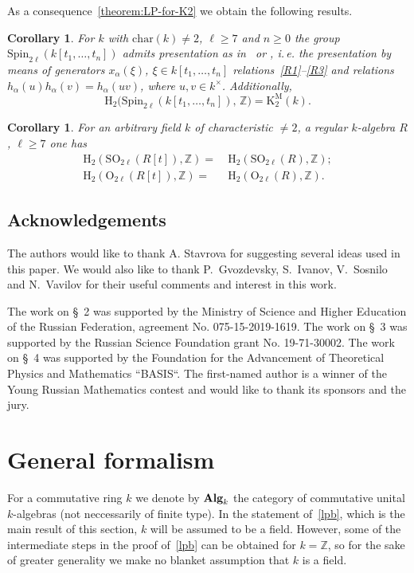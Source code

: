 \documentclass[oneside, 11pt]{amsart} \pdfoutput=1
\newcommand{\K}{{\mathrm{K}}}
\numberwithin{equation}{section}
\newtheorem{corollary}[lemma]{Corollary}
\theoremstyle{definition}
\newcommand{\ZZ}{\mathbb{Z}}
\newcommand{\catname}[1]{{\normalfont\textbf{#1}}} %
\begin{document}
As a consequence~\cref{theorem:LP-for-K2} we obtain the following results.
\begin{corollary} \label{cor:various-facts}
For $k$ with $\mathrm{char}(k)\neq 2$, $\ell \geq 7$ and $n\geq 0$ the group $\mathrm{Spin}_{2\ell}(k[t_1,\ldots, t_n])$ admits presentation as in~\cite[\S~6]{St67} or \cite[\S~5]{Ma69}, i.\,e. the presentation by means of generators $x_\alpha(\xi)$, $\xi \in k[t_1,\ldots, t_n]$ relations~\eqref{R1}--\eqref{R3} and relations $h_\alpha(u)h_\alpha(v) = h_\alpha(uv)$, where $u, v\in k^\times$. Additionally,
\[\mathrm H_2(\mathrm{Spin}_{2\ell}(k[t_1,\ldots,t_n]),\,\mathbb Z\big) = \K^\mathrm{M}_2(k).\]
\end{corollary}
\begin{corollary} \label{cor:H_2-O}
 For an arbitrary field $k$ of characteristic $\neq 2$, a regular $k$-algebra $R$, $\ell \geq 7$ one has
 \begin{align}
  \mathrm H_2 (\mathrm{SO}_{2\ell}(R[t]), \ZZ) =&\ \mathrm H_2 (\mathrm{SO}_{2\ell}(R), \ZZ); \label{eq:H_2-SO} \\
  \mathrm H_2 (\mathrm{O}_{2\ell}(R[t]), \ZZ) =&\ \mathrm H_2 (\mathrm{O}_{2\ell}(R), \ZZ). \label{eq:H_2-O}
 \end{align}
\end{corollary}

\subsection{Acknowledgements} The authors would like to thank A. Stavrova for suggesting several ideas used in this paper. We would also like to thank P.~Gvozdevsky, S.~Ivanov, V.~Sosnilo and N.~Vavilov for their useful comments and interest in this work.

The work on \S~2 was supported by the Ministry of Science and Higher Education of the Russian Federation, agreement No. 075-15-2019-1619. The work on \S~3 was supported by the Russian Science Foundation grant No. 19-71-30002. The work on \S~4 was supported by the Foundation for the Advancement of Theoretical Physics and Mathematics “BASIS“. The first-named author is a winner of the Young Russian Mathematics contest and would like to thank its sponsors and the jury.

\section{General formalism}
For a commutative ring $k$ we denote by $\catname{Alg}_k$ the category of commutative unital $k$-algebras (not neccessarily of finite type). In the statement of~\cref{lpb}, which is the main result of this section, $k$ will be assumed to be a field. However, some of the intermediate steps in the proof of~\cref{lpb} can be obtained for $k=\ZZ$, so for the sake of greater generality we make no blanket assumption that $k$ is a field.  
\end{document}
